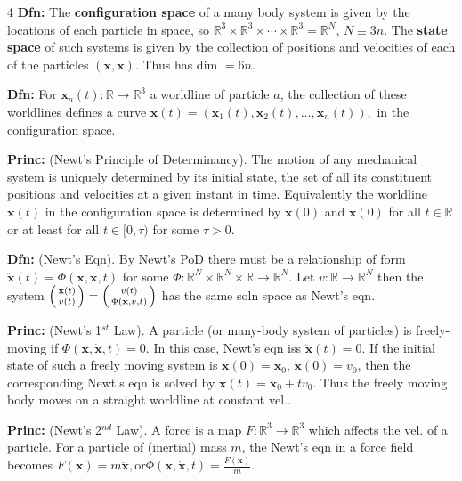 \documentclass[landscape, 8pt]{extarticle}
\begin{document}
\begin{multicols*}{4}
		\textbf{Dfn:} The \textbf{configuration space} of a many body system is given by the locations of each particle in space, so $\mathbb{R}^3\times\mathbb{R}^3\times\cdots\times\mathbb{R}^3 = \mathbb{R}^N$, $N\equiv 3n$. The \textbf{state space} of such systems is given by the collection of positions and velocities of each of the particles $(\mathbf{x},\dot{\mathbf{x}})$. Thus has dim $= 6n$.
		
		\textbf{Dfn:} For $\mathbf{x}_a(t):\mathbb{R}\to\mathbb{R}^3$ a worldline of particle $a$, the collection of these worldlines defines a curve
		$
		\mathbf{x}(t)=(\mathbf{x}_1(t),\mathbf{x}_2(t),\ldots,\mathbf{x}_n(t)),
		$
		in the configuration space.
		
		\textbf{Princ:} (Newt's Principle of Determinancy). The motion of any mechanical system is uniquely determined by its initial state, the set of all its constituent positions and velocities at a given instant in time. Equivalently the worldline $\mathbf{x}(t)$ in the configuration space is determined by $\mathbf{x}(0)$ and $\dot{\mathbf{x}}(0)$ for all $t\in\mathbb{R}$ or at least for all $t\in[0,\tau)$ for some $\tau>0$.
		
		\textbf{Dfn:} (Newt's Eqn). By Newt's PoD there must be a relationship of form
		$
		\ddot{\mathbf{x}}(t)=\Phi(\mathbf{x},\dot{\mathbf{x}},t)
		$
		for some $\Phi:\mathbb{R}^N\times\mathbb{R}^N\times\mathbb{R}\to\mathbb{R}^N$. Let $v:\mathbb{R}\to\mathbb{R}^N$ then the system
		$
		\begin{psmallmatrix*}\dot{\mathbf{x}}(t)\\ v(t)\end{psmallmatrix*} = \begin{psmallmatrix*}v(t)\\ \Phi(\mathbf{x},v,t)\end{psmallmatrix*}
		$
		has the same soln space as Newt's eqn.
		
		\textbf{Princ:} (Newt's 1$^{st}$ Law). A particle (or many-body system of particles) is freely-moving if $\Phi(\mathbf{x},\dot{\mathbf{x}},t)=0$. In this case, Newt's eqn iss $\ddot{\mathbf{x}}(t)=0$. If the initial state of such a freely moving system is $\mathbf{x}(0)=\mathbf{x}_0$, $\dot{\mathbf{x}}(0)=v_0$, then the corresponding Newt's eqn is solved by $\mathbf{x}(t)=\mathbf{x}_0+tv_0$. Thus the freely moving body moves on a straight worldline at constant vel..
		
		\textbf{Princ:} (Newt's 2$^{nd}$ Law). A force is a map $F:\mathbb{R}^3\to\mathbb{R}^3$ which affects the vel. of a particle. For a particle of (inertial) mass $m$, the Newt's eqn in a force field becomes
		$
		F(\mathbf{x})=m\ddot{\mathbf{x}},\text{or} \Phi(\mathbf{x},\dot{\mathbf{x}},t)=\frac{F(\mathbf{x})}{m}.
		$
		

\end{multicols*}
\end{document}
